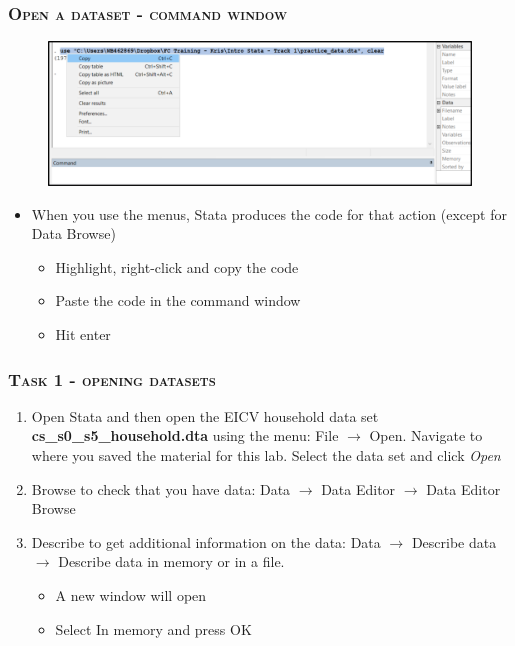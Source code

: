 \documentclass[10pt]{beamer}
\begin{document}
	\begin{frame}
		\frametitle{\textsc{Open a dataset - command window}}
		\begin{figure}[H] 
			\centering
			\includegraphics[width=0.9\linewidth]{open_dataset_command}
		\end{figure}
		\begin{itemize}
			\item When you use the menus, Stata produces the code for that action (except for Data Browse)
			\begin{itemize}
				\item Highlight, right-click and copy the code
				\item Paste the code in the command window
				\item Hit enter
			\end{itemize}
		\end{itemize}
	\end{frame}


	\begin{frame}
			\frametitle{\textsc{Task 1 - opening datasets}}
		\begin{enumerate}
			 \item Open Stata and then open the EICV household data set \textbf{cs\_s0\_s5\_household.dta} using the menu: File $\rightarrow$ Open. Navigate to where you saved the material for this lab. Select the data set and click \textit{Open}
			\onslide<2-> \item Browse to check that you have data: Data  $\rightarrow$ Data Editor  $\rightarrow$ Data Editor Browse 
			\onslide<3-> \item Describe to get additional information on the data: Data  $\rightarrow$ Describe data $\rightarrow$ Describe data in memory or in a file.
			\begin{itemize}
				\item A new window will open
				\item Select In memory and press OK
			\end{itemize}
		\end{enumerate}
	\end{frame}
\end{document}

